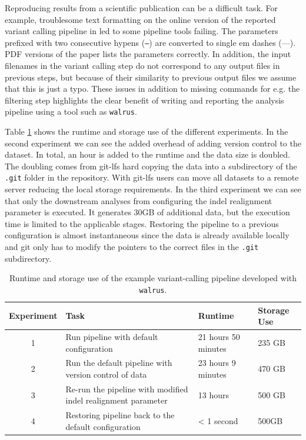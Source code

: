 Reproducing results from a scientific publication can be a difficult task. For
example, troublesome text formatting on the online version of the reported
variant calling pipeline in \cite{cornish2015comparison} led to some pipeline
tools failing. The parameters prefixed with two consecutive hypens (\texttt{--})
are converted to single em dashes (---).  PDF versions of the paper lists the
parameters correctly.  In addition, the input filenames in the variant calling
step do not correspond to any output files in previous steps, but because of
their similarity to previous output files we assume that this is just a typo.
These issues in addition to missing commands for e.g. the filtering step
highlights the clear benefit of writing and reporting the analysis pipeline
using a tool such as \texttt{walrus}. 

Table \ref{resultstable} shows the runtime and storage use of the different
experiments. In the second experiment we can see the added overhead of adding
version control to the dataset. In total, an hour is added to the runtime and
the data size is doubled. The doubling comes from git-lfs hard copying the data
into a subdirectory of the \texttt{.git} folder in the repository. With git-lfs
users can move all datasets to a remote server reducing the local storage
requirements. 
In the third experiment we can see that only the downstream analyses from
configuring the indel realignment parameter is executed. It generates 30GB of
additional data, but the execution time is limited to the applicable stages.
Restoring the pipeline to a previous configuration is almost instantaneous since
the data is already available locally and git only has to modify the pointers to
the correct files in the \texttt{.git} subdirectory. 

\begin{table}[ht!]
    \centering
    \caption{Runtime and storage use of the example variant-calling pipeline
    developed with \texttt{walrus}.} 
    \begin{tabular}{ | c | p{4cm} | p{2cm} | p{2cm} |}
    \hline
    Experiment & Task & Runtime & Storage Use \\ \hline
    1 & Run pipeline with default configuration & 21 hours 50 minutes & 235 GB
        \\ \hline
    2 & Run the default pipeline with version control of data & 23 hours 9
        minutes & 470 GB \\ \hline
    3 & Re-run the pipeline with modified indel realignment parameter & 13 hours
        & 500 GB \\ \hline
    4 & Restoring pipeline back to the default configuration & < 1 second &
        500GB \\ \hline
    \end{tabular}
    \label{resultstable}
\end{table}


